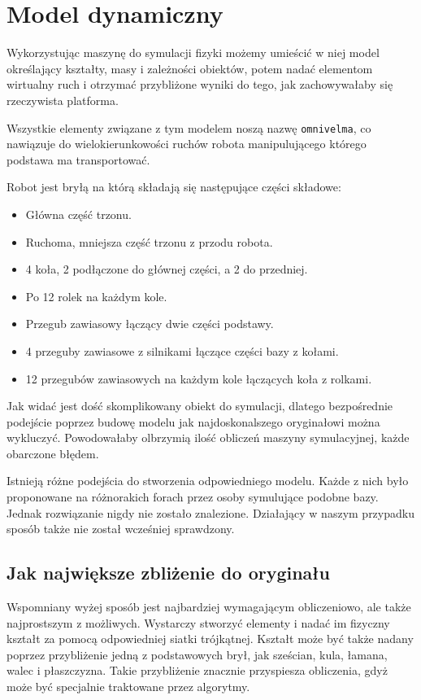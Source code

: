 \section{Model dynamiczny}
Wykorzystując maszynę do symulacji fizyki możemy umieścić w niej model określający kształty, masy i zależności obiektów, potem nadać elementom wirtualny ruch i otrzymać przybliżone wyniki do tego, jak zachowywałaby się rzeczywista platforma.

Wszystkie elementy związane z tym modelem noszą nazwę \texttt{omnivelma}, co nawiązuje do wielokierunkowości ruchów robota manipulującego którego podstawa ma transportować.

Robot jest bryłą na którą składają się następujące części składowe:
\begin{itemize}
 \item Główna część trzonu.
 \item Ruchoma, mniejsza część trzonu z przodu robota.
 \item 4 koła, 2 podłączone do głównej części, a 2 do przedniej.
 \item Po 12 rolek na każdym kole.
 \item Przegub zawiasowy łączący dwie części podstawy.
 \item 4 przeguby zawiasowe z silnikami łączące części bazy z kołami.
 \item 12 przegubów zawiasowych na każdym kole łączących koła z rolkami.
\end{itemize}

Jak widać jest dość skomplikowany obiekt do symulacji, dlatego bezpośrednie podejście poprzez budowę modelu jak najdoskonalszego oryginałowi można wykluczyć.
Powodowałaby olbrzymią ilość obliczeń maszyny symulacyjnej, każde obarczone błędem.

Istnieją różne podejścia do stworzenia odpowiedniego modelu. Każde z nich było proponowane na różnorakich forach przez osoby symulujące podobne bazy.
Jednak rozwiązanie nigdy nie zostało znalezione.
Działający w naszym przypadku sposób także nie został wcześniej sprawdzony.

\subsection{Jak największe zbliżenie do oryginału}
Wspomniany wyżej sposób jest najbardziej wymagającym obliczeniowo, ale także najprostszym z możliwych.
Wystarczy stworzyć elementy i nadać im fizyczny kształt za pomocą odpowiedniej siatki trójkątnej.
Kształt może być także nadany poprzez przybliżenie jedną z podstawowych brył, jak sześcian, kula, łamana, walec i płaszczyzna.
Takie przybliżenie znacznie przyspiesza obliczenia, gdyż może być specjalnie traktowane przez algorytmy.

